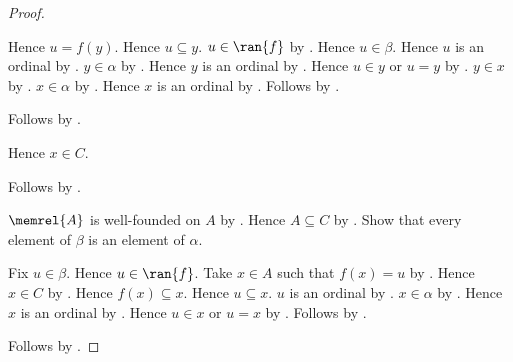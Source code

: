 \begin{proof}
\begin{subproof}
\begin{subproof}
\begin{subproof}
\begin{subproof}
                    Hence $u=f(y)$.
                    Hence $u\subseteq y$.
                    $u\in\ran{f}$ by .
                    Hence $u\in\beta$.
                    Hence $u$ is an ordinal by
                        .
                    $y\in\alpha$ by .
                    Hence $y$ is an ordinal by
                        .
                    Hence $u\in y$ or $u=y$ by
                        .
                    $y\in x$ by
                        .
                    $x\in\alpha$ by .
                    Hence $x$ is an ordinal by
                        .
                    Follows by .
                \end{subproof}
                Follows by .
            \end{subproof}
            Hence $x\in C$.
        \end{subproof}
        Follows by .
    \end{subproof}
    $\memrel{A}$ is well-founded on $A$ by
        .
    Hence $A\subseteq C$ by .
    Show that every element of $\beta$ is an element of $\alpha$.
    \begin{subproof}
        Fix $u\in\beta$.
        Hence $u\in\ran{f}$.
        Take $x\in A$ such that $f(x)=u$ by .
        Hence $x\in C$ by .
        Hence $f(x)\subseteq x$.
        Hence $u\subseteq x$.
        $u$ is an ordinal by .
        $x\in\alpha$ by .
        Hence $x$ is an ordinal by .
        Hence $u\in x$ or $u=x$ by
            .
        Follows by .
    \end{subproof}
    Follows by .
\end{proof}

